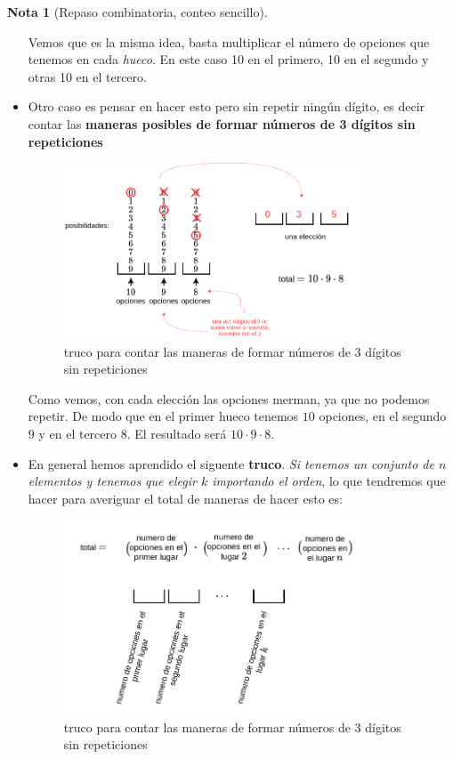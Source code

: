 \documentclass[]{book}
\theoremstyle{plain}
\theoremstyle{definition}
\newtheorem{note}[theorem]{Nota}
\theoremstyle{definition} %
\begin{document}
\begin{note}[Repaso combinatoria, conteo sencillo]
\begin{itemize}
Vemos que es la misma idea, basta multiplicar el número de opciones que tenemos en cada \emph{hueco}. En este caso 10 en el primero, 10 en el segundo y otras 10 en el tercero.

\item Otro caso es pensar en hacer esto pero sin repetir ningún dígito, es decir contar las \textbf{maneras posibles de formar números de 3 dígitos sin repeticiones}

\begin{figure}[htbp]
  \centering
  \includegraphics[width=3.5in,height=\textheight]{img/conteo_basico_3.png}
  \caption{truco para contar las maneras de formar números de 3 dígitos sin repeticiones}
  \end{figure}%

Como vemos, con cada elección las opciones merman, ya que no podemos repetir. De modo que en el primer hueco tenemos $10$ opciones, en el segundo $9$ y en el tercero $8$. El resultado 
será $10 \cdot 9 \cdot 8$. 

\item En general hemos aprendido el siguente \textbf{truco}. \emph{Si tenemos un conjunto de $n$ elementos y tenemos que elegir $k$ importando el orden},
 lo que tendremos que hacer para averiguar el total de maneras de hacer esto es:

\begin{figure}[htbp]
  \centering
  \includegraphics[width=3.5in,height=\textheight]{img/conteo_basico_4.png}
  \caption{truco para contar las maneras de formar números de 3 dígitos sin repeticiones}
  \end{figure}%

\end{itemize}

\end{note}
\end{document}
